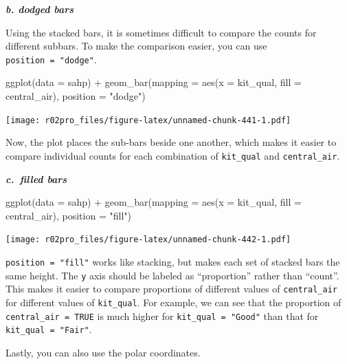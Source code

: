 \documentclass[
]{book}
\newenvironment{Shaded}{\begin{snugshade}}{\end{snugshade}}
\newcommand{\AttributeTok}[1]{\textcolor[rgb]{0.77,0.63,0.00}{#1}}
\newcommand{\FunctionTok}[1]{\textcolor[rgb]{0.00,0.00,0.00}{#1}}
\newcommand{\NormalTok}[1]{#1}
\newcommand{\SpecialCharTok}[1]{\textcolor[rgb]{0.00,0.00,0.00}{#1}}
\newcommand{\StringTok}[1]{\textcolor[rgb]{0.31,0.60,0.02}{#1}}
\begin{document}
\textbf{\emph{b. dodged bars}}

Using the stacked bars, it is sometimes difficult to compare the counts for different subbars. To make the comparison easier, you can use \texttt{position\ =\ "dodge"}.

\begin{Shaded}
\begin{Highlighting}[]
\FunctionTok{ggplot}\NormalTok{(}\AttributeTok{data =}\NormalTok{ sahp) }\SpecialCharTok{+} \FunctionTok{geom\_bar}\NormalTok{(}\AttributeTok{mapping =} \FunctionTok{aes}\NormalTok{(}\AttributeTok{x =}\NormalTok{ kit\_qual, }\AttributeTok{fill =}\NormalTok{ central\_air), }\AttributeTok{position =} \StringTok{"dodge"}\NormalTok{)}
\end{Highlighting}
\end{Shaded}

\texttt{[image: r02pro\_files/figure-latex/unnamed-chunk-441-1.pdf]}

Now, the plot places the sub-bars beside one another, which makes it easier to compare individual counts for each combination of \texttt{kit\_qual} and \texttt{central\_air}.

\textbf{\emph{c.~filled bars}}

\begin{Shaded}
\begin{Highlighting}[]
\FunctionTok{ggplot}\NormalTok{(}\AttributeTok{data =}\NormalTok{ sahp) }\SpecialCharTok{+} \FunctionTok{geom\_bar}\NormalTok{(}\AttributeTok{mapping =} \FunctionTok{aes}\NormalTok{(}\AttributeTok{x =}\NormalTok{ kit\_qual, }\AttributeTok{fill =}\NormalTok{ central\_air), }\AttributeTok{position =} \StringTok{"fill"}\NormalTok{)}
\end{Highlighting}
\end{Shaded}

\texttt{[image: r02pro\_files/figure-latex/unnamed-chunk-442-1.pdf]}

\texttt{position\ =\ "fill"} works like stacking, but makes each set of stacked bars the same height. The \texttt{y} axis should be labeled as ``proportion'' rather than ``count''. This makes it easier to compare proportions of different values of \texttt{central\_air} for different values of \texttt{kit\_qual}. For example, we can see that the proportion of \texttt{central\_air\ =\ TRUE} is much higher for \texttt{kit\_qual\ =\ "Good"} than that for \texttt{kit\_qual\ =\ "Fair"}.

Lastly, you can also use the polar coordinates.
\end{document}
